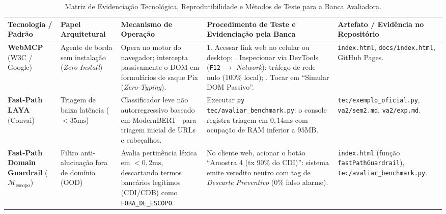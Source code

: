\begin{table}[!htbp]
\centering
\caption{Matriz de Evidencia\c{c}\~{a}o Tecnol\'{o}gica, Reprodutibilidade e M\'{e}todos de Teste para a Banca Avaliadora.}
\label{tab:evidencias_tecnologicas}
\setlength{\tabcolsep}{2.5pt}
\scriptsize
\begin{tabular}{p{1.7cm}p{1.6cm}p{2.6cm}p{3.3cm}p{1.9cm}}
\toprule
\textbf{Tecnologia / Padr\~{a}o} & \textbf{Papel Arquitetural} & \textbf{Mecanismo de Opera\c{c}\~{a}o} & \textbf{Procedimento de Teste e Evidencia\c{c}\~{a}o pela Banca} & \textbf{Artefato / Evid\^{e}ncia no Reposit\'{o}rio} \\
\midrule
\textbf{WebMCP} (W3C / Google)~\cite{w3c2025webmcp} & Agente de borda sem instala\c{c}\~{a}o (\textit{Zero-Install}) & Opera no motor do navegador; intercepta passivamente o DOM em formul\'{a}rios de saque Pix (\textit{Zero-Typing}). & 1. Acessar link web no celular ou desktop; \newline 2. Inspecionar via DevTools (\texttt{F12} $\rightarrow$ \textit{Network}): tr\'{a}fego de rede nulo (100\% local); \newline 3. Tocar em ``Simular DOM Passivo''. & \texttt{index.html}, \newline \texttt{docs/index.html}, \newline GitHub Pages. \\
\midrule
\textbf{Fast-Path LAYA} (Convai)~\cite{convai2026laya} & Triagem de baixa lat\^{e}ncia ($< 35\text{ms}$) & Classificador leve n\~{a}o autorregressivo baseado em ModernBERT~\cite{warner2024modernbert} para triagem inicial de URLs e cabe\c{c}alhos. & Executar \texttt{py tec/avaliar\_benchmark.py}: o console registra triagem em $0{,}14\text{ms}$ com ocupa\c{c}\~{a}o de RAM inferior a $95\text{MB}$. & \texttt{tec/exemplo\_oficial.py}, \newline \texttt{va2/sem2.md}, \newline \texttt{va2/exp.md}. \\
\midrule
\textbf{Fast-Path Domain Guardrail} ($\mathcal{M}_{\text{escopo}}$) & Filtro anti-alucina\c{c}\~{a}o fora de dom\'{i}nio (OOD) & Avalia pertin\^{e}ncia l\'{e}xica em $< 0{,}2\text{ms}$, descartando termos banc\'{a}rios leg\'{i}timos (CDI/CDB) como \texttt{FORA\_DE\_ESCOPO}. & No cliente web, acionar o bot\~{a}o ``Amostra 4 (tx 90\% do CDI)'': sistema emite veredito neutro com tag de \textit{Descarte Preventivo} (0\% falso alarme). & \texttt{index.html} (fun\c{c}\~{a}o \texttt{fastPathGuardrail}), \newline \texttt{tec/avaliar\_benchmark.py}. \\

\end{tabular}
\end{table}
